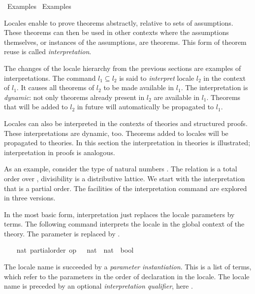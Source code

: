 %
\begin{isabellebody}%
\def\isabellecontext{Examples{\isadigit{1}}}%
%
\isadelimtheory
%
\endisadelimtheory
%
\isatagtheory
{}\isamarkupfalse%
\ Examples{}\isanewline
{}\ Examples\isanewline
{}%
\endisatagtheory
{\isafoldtheory}%
%
\isadelimtheory
%
\endisadelimtheory
%
\isamarkuptrue%
%
\begin{isamarkuptext}%
Locales enable to prove theorems abstractly, relative to
  sets of assumptions.  These theorems can then be used in other
  contexts where the assumptions themselves, or
  instances of the assumptions, are theorems.  This form of theorem
  reuse is called \emph{interpretation}.

  The changes of the locale
  hierarchy from the previous sections are examples of
  interpretations.  The command  $l_1
  \subseteq l_2$ is said to \emph{interpret} locale $l_2$ in the
  context of $l_1$.  It causes all theorems of $l_2$ to be made
  available in $l_1$.  The interpretation is \emph{dynamic}: not only
  theorems already present in $l_2$ are available in $l_1$.  Theorems
  that will be added to $l_2$ in future will automatically be
  propagated to $l_1$.

  Locales can also be interpreted in the contexts of theories and
  structured proofs.  These interpretations are dynamic, too.
  Theorems added to locales will be propagated to theories.
  In this section the interpretation in
  theories is illustrated; interpretation in proofs is analogous.

  As an example, consider the type of natural numbers .  The
  relation \isa{{\isasymle}} is a total order over ,
  divisibility  is a distributive lattice.  We start with the
  interpretation that \isa{{\isasymle}} is a partial order.  The facilities of
  the interpretation command are explored in three versions.%
\end{isamarkuptext}%
\isamarkuptrue%
%
\isamarkuptrue%
%
\begin{isamarkuptext}%
In the most basic form, interpretation just replaces the locale
  parameters by terms.  The following command interprets the locale
   in the global context of the theory.  The
  parameter  is replaced by .%
\end{isamarkuptext}%
\isamarkuptrue%
%
\isadelimvisible
\ \ %
\endisadelimvisible
%
\isatagvisible
{}\isamarkupfalse%
\ nat{\isacharcolon}\ partial{\isacharunderscore}order\ {\isachardoublequoteopen}op\ {\isasymle}\ {\isacharcolon}{\isacharcolon}\ nat\ {\isasymRightarrow}\ nat\ {\isasymRightarrow}\ bool{\isachardoublequoteclose}%
\begin{isamarkuptxt}%
The locale name is succeeded by a \emph{parameter
  instantiation}.  This is a list of terms, which refer to
  the parameters in the order of declaration in the locale.  The
  locale name is preceded by an optional \emph{interpretation
  qualifier}, here .


\end{isamarkuptxt}
\end{isabellebody}
